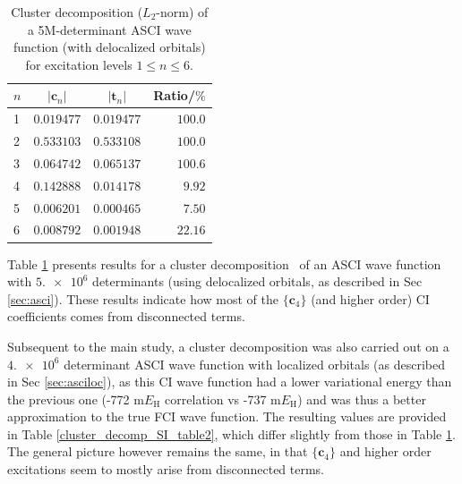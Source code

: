 \documentclass[journal=jcp,manuscript=suppinfo]{achemso}
\begin{document}
%
\begin{table}[ht!]
\begin{center}
\caption{Cluster decomposition ($L_2$-norm) of a 5M-determinant ASCI wave function (with delocalized orbitals) for excitation levels $1 \leq n \leq 6$.}
\label{cluster_decomp_SI_table}
\begin{tabular}{l|r|r|r}
\toprule
\multicolumn{1}{c|}{$n$} & \multicolumn{1}{c|}{$|\bm{c}_n|$} & \multicolumn{1}{c|}{$|\bm{t}_n|$} & \multicolumn{1}{c}{Ratio/$\%$} \\
\midrule\midrule
1 & $0.019477$ & $0.019477$ & $100.0$ \\
2 & $0.533103$ & $0.533108$ & $100.0$ \\
3 & $0.064742$ & $0.065137$ & $100.6$ \\
4 & $0.142888$ & $0.014178$ & $9.92$ \\
5 & $0.006201$ & $0.000465$ & $7.50$ \\
6 & $0.008792$ & $0.001948$ & $22.16$ \\
\midrule
\end{tabular}
\vspace{-0.6cm}
\end{center}
\end{table}
%
Table \ref{cluster_decomp_SI_table} presents results for a cluster decomposition~\cite{lehtola_head_gordon_fci_decomp_jcp_2017} of an ASCI wave function with $\num{5.e6}$ determinants (using delocalized orbitals, as described in Sec \ref{sec:asci}). These results indicate how most of the $\{\bm{c}_4\}$ (and higher order) CI coefficients comes from disconnected terms.  


Subsequent to the main study, a cluster decomposition was also carried out on a $\num{4.e6}$ determinant ASCI wave function with localized orbitals (as described in Sec \ref{sec:asciloc}), as this CI wave function had a lower variational energy than the previous one (-772 m$E_{\text{H}}$ correlation vs -737 m$E_{\text{H}}$) and was thus a better approximation to the true FCI wave function. The resulting values are provided in Table \ref{cluster_decomp_SI_table2}, which differ slightly from those in Table \ref{cluster_decomp_SI_table}. The general picture however remains the same, in that $\{\bm{c}_4\}$ and higher order excitations seem to mostly arise from disconnected terms. 
\end{document}
